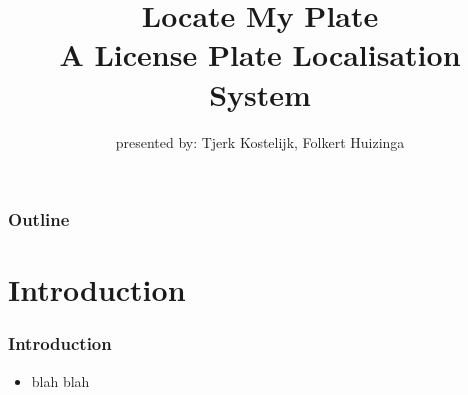 \documentclass{beamer}
\title{Locate My Plate \\ A License Plate Localisation System}
\subtitle{presented by: Tjerk Kostelijk, Folkert Huizinga}
\date{}
\begin{document}
\frame{\titlepage}

\setcounter{tocdepth}{1}

\frame
{
  \frametitle{Outline}
  \small
  \tableofcontents
  \normalsize
}

\setcounter{tocdepth}{2}

\section{Introduction}
\frame
{
  \frametitle{Introduction}
	
  \begin{itemize}
  \item <+-| alert@+> blah blah 
  \end{itemize}
}


\end{document}
